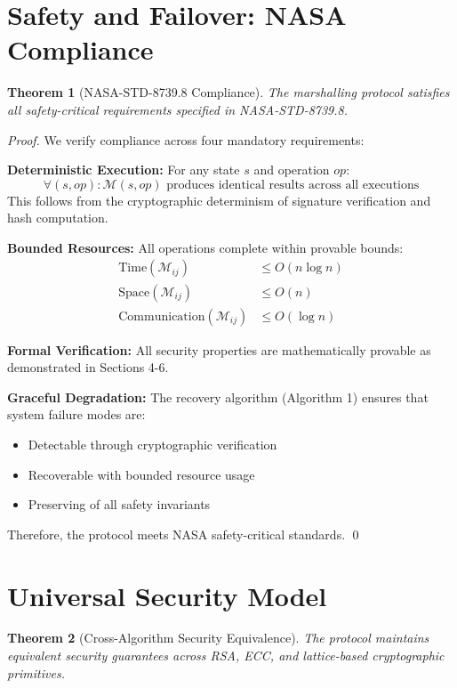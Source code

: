 \documentclass[11pt,a4paper]{article}
\newtheorem{theorem}{Theorem}[section]
\theoremstyle{definition}
\theoremstyle{remark}
\newcommand{\M}{\mathcal{M}}
\begin{document}
\section{Safety and Failover: NASA Compliance}

\begin{theorem}[NASA-STD-8739.8 Compliance]
The marshalling protocol satisfies all safety-critical requirements specified in NASA-STD-8739.8.
\end{theorem}

\begin{proof}
We verify compliance across four mandatory requirements:

\textbf{Deterministic Execution:} For any state $s$ and operation $op$:
$$\forall (s, op) : \M(s, op) \text{ produces identical results across all executions}$$
This follows from the cryptographic determinism of signature verification and hash computation.

\textbf{Bounded Resources:} All operations complete within provable bounds:
\begin{align}
\text{Time}(\M_{ij}) &\leq O(n \log n) \\
\text{Space}(\M_{ij}) &\leq O(n) \\
\text{Communication}(\M_{ij}) &\leq O(\log n)
\end{align}

\textbf{Formal Verification:} All security properties are mathematically provable as demonstrated in Sections 4-6.

\textbf{Graceful Degradation:} The recovery algorithm (Algorithm 1) ensures that system failure modes are:
\begin{itemize}
    \item Detectable through cryptographic verification
    \item Recoverable with bounded resource usage
    \item Preserving of all safety invariants
\end{itemize}

Therefore, the protocol meets NASA safety-critical standards. \qed
\end{proof}

\section{Universal Security Model}

\begin{theorem}[Cross-Algorithm Security Equivalence]
The protocol maintains equivalent security guarantees across RSA, ECC, and lattice-based cryptographic primitives.
\end{theorem}
\end{document}
